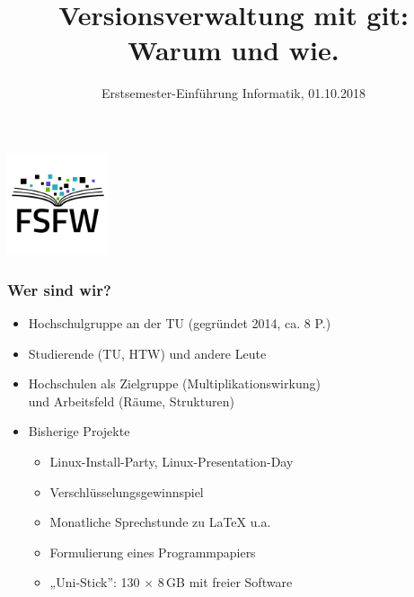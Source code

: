 \documentclass{beamer}
\title{Versionsverwaltung mit git: Warum und wie.}
\subtitle{Erstsemester-Einführung Informatik, 01.10.2018}
\begin{document}
\begin{frame}
  \begin{center}%
    \includegraphics[width=3cm]{img-src/fsfw-logo-with-text.pdf}\\

    \vspace*{-0.5\baselineskip}

    \parbox{.95\columnwidth}{\centering\Large\inserttitle}

    \vspace*{\baselineskip}

    \structure{\large \insertsubtitle}
  \end{center}
\end{frame}

\begin{frame}[label=wb]

\begin{center}
 \vspace{10mm}
\end{center}

\end{frame}



\begin{frame}[label=ct1]
  \frametitle{Wer sind wir?}

  \onslide<+->

  \begin{itemize}
  \item Hochschulgruppe an der TU (gegründet 2014, ca. 8 P.)
  \item Studierende (TU, HTW) und andere Leute
  \item Hochschulen als Zielgruppe (Multiplikationswirkung)\\
    und Arbeitsfeld (Räume, Strukturen)

    \bigskip\onslide<+->

  \item Bisherige Projekte
    \begin{itemize}
    \item Linux-Install-Party, Linux-Presentation-Day
    \item Verschlüsselungsgewinnspiel
    \item Monatliche Sprechstunde zu \LaTeX{} u.a.
    \item Formulierung eines Programmpapiers
    \item „Uni-Stick”: 130 $\times$ 8\,GB mit freier Software
    \end{itemize}
  \end{itemize}
\end{frame}
\end{document}
